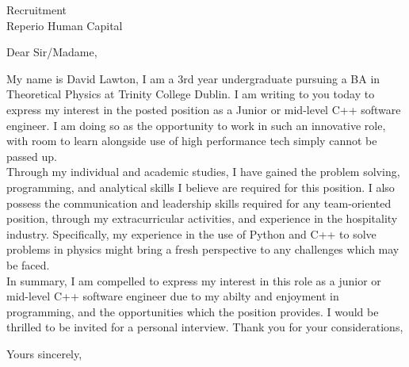 \documentclass{letter}
\begin{document}
\begin{letter}{Recruitment\\ Reperio Human Capital}

\opening{Dear Sir/Madame,}
My name is David Lawton, I am a 3rd year undergraduate pursuing a BA in Theoretical Physics at Trinity College Dublin.
I am writing to you today to express my interest in the posted position as a Junior or mid-level C++ software engineer. I am doing so as the opportunity to work in such an innovative role, with room to learn alongside use of high performance tech simply cannot be passed up.\\

\indent Through my individual and academic studies, I have gained the problem solving, programming, and analytical skills I believe are required for this position. I also possess the communication and leadership skills required for any team-oriented position, through my extracurricular activities, and experience in the hospitality industry. Specifically, my experience in the use of Python and C++ to solve problems in physics might bring a fresh perspective to any challenges which may be faced.\\

\indent In summary, I am compelled to express my interest in this role as a junior or mid-level C++ software engineer due to my abilty and enjoyment in programming, and the opportunities which the position provides. I would be thrilled to be invited for a personal interview. Thank you for your considerations,
\closing{Yours sincerely,}

\end{letter}
\end{document}

